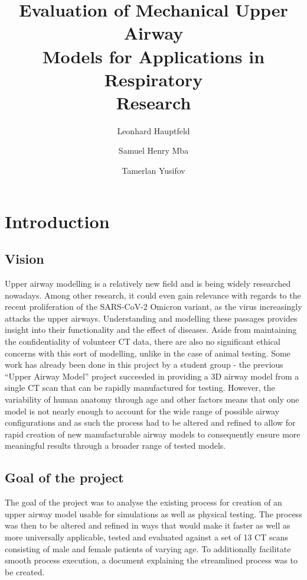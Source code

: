 \documentclass[MME,Projekt,english]{twbook}%
\title{Evaluation of Mechanical Upper Airway \\Models for Applications in Respiratory \\Research}
\author{Leonhard Hauptfeld\and{}Samuel Henry Mba\and{}Tamerlan Yusifov\\}
\begin{document}
\maketitle

\chapter{Introduction}

\section{Vision}

Upper airway modelling is a relatively new field and is being widely researched nowadays. Among other research, it could even gain relevance with regards to the recent proliferation of the SARS-CoV-2 Omicron variant, as the virus increasingly attacks the upper airways\cite{omicronairways}. Understanding and modelling these passages provides insight into their functionality and the effect of diseases. Aside from maintaining the confidentiality of volunteer CT data, there are also no significant ethical concerns with this sort of modelling, unlike in the case of animal testing. Some work has already been done in this project by a student group - the previous “Upper Airway Model” project succeeded in providing a 3D airway model from a single CT scan that can be rapidly manufactured for testing. However, the variability of human anatomy through age and other factors means that only one model is not nearly enough to account for the wide range of possible airway configurations and as such the process had to be altered and refined to allow for rapid creation of new manufacturable airway models to consequently ensure more meaningful results through a broader range of tested models.

\section{Goal of the project}

The goal of the project was to analyse the existing process for creation of an upper airway model usable for simulations as well as physical testing. The process was then to be altered and refined in ways that would make it faster as well as more universally applicable, tested and evaluated against a set of 13 CT scans consisting of male and female patients of varying age. To additionally facilitate smooth process execution, a document explaining the streamlined process was to be created.
\end{document}

